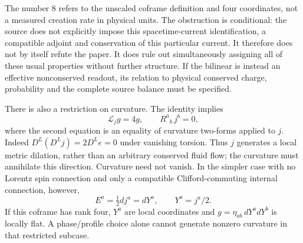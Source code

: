 \documentclass[11pt,a4paper]{article}
\begin{document}
The number $8$ refers to the unscaled coframe definition and four
coordinates, not a measured creation rate in physical units. The
obstruction is conditional: the source does not explicitly impose this
spacetime-current identification, a compatible adjoint and conservation
of this particular current. It therefore does not by itself refute the
paper. It does rule out simultaneously assigning all of these usual
properties without further structure. If the bilinear is instead an
effective nonconserved readout, its relation to physical conserved
charge, probability and the complete source balance must be specified.

There is also a restriction on curvature. The identity implies
\[
 \mathcal L_jg=4g,\qquad R^a{}_b\,j^b=0,
\]
where the second equation is an equality of curvature two-forms applied
to $j$. Indeed $D^L(D^Lj)=2D^Le=0$ under vanishing torsion.
Thus $j$ generates a local metric dilation, rather than an arbitrary
conserved fluid flow; the curvature must annihilate this direction.
Curvature need not vanish. In the simpler case with no Lorentz spin
connection and only a compatible Clifford-commuting internal connection,
however,
\[
 E^a=\tfrac12 dj^a=dY^a,\qquad Y^a=j^a/2.
\]
If this coframe has rank four, $Y^a$ are local coordinates and
$g=\eta_{ab}\,dY^a dY^b$ is locally flat. A phase/profile choice alone
cannot generate nonzero curvature in that restricted subcase.
\end{document}
